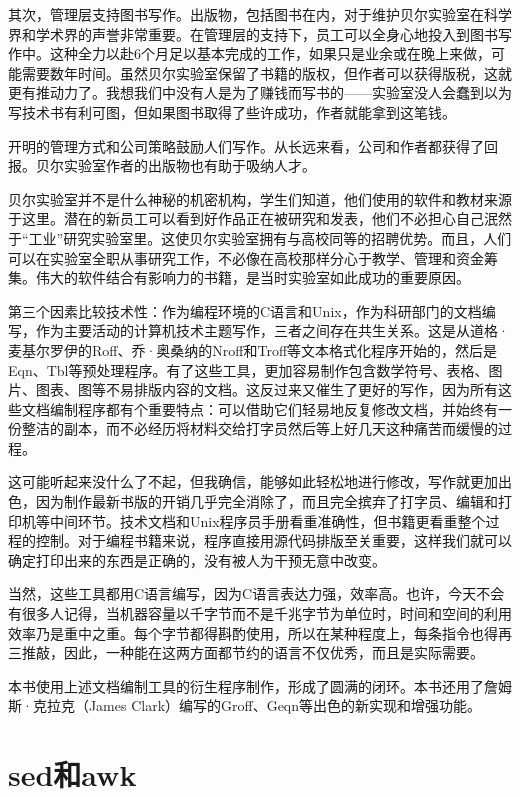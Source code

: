 \documentclass[a4paper,12pt,UTF8,twoside]{ctexbook}
\begin{document}
其次，管理层支持图书写作。出版物，包括图书在内，对于维护贝尔实验室在科学界和学术界的声誉非常重要。在管理层的支持下，员工可以全身心地投入到图书写作中。这种全力以赴6个月足以基本完成的工作，如果只是业余或在晚上来做，可能需要数年时间。虽然贝尔实验室保留了书籍的版权，但作者可以获得版税，这就更有推动力了。我想我们中没有人是为了赚钱而写书的——实验室没人会蠢到以为写技术书有利可图，但如果图书取得了些许成功，作者就能拿到这笔钱。

开明的管理方式和公司策略鼓励人们写作。从长远来看，公司和作者都获得了回报。贝尔实验室作者的出版物也有助于吸纳人才。

贝尔实验室并不是什么神秘的机密机构，学生们知道，他们使用的软件和教材来源于这里。潜在的新员工可以看到好作品正在被研究和发表，他们不必担心自己泯然于“工业”研究实验室里。这使贝尔实验室拥有与高校同等的招聘优势。而且，人们可以在实验室全职从事研究工作，不必像在高校那样分心于教学、管理和资金筹集。伟大的软件结合有影响力的书籍，是当时实验室如此成功的重要原因。

第三个因素比较技术性：作为编程环境的C语言和Unix，作为科研部门的文档编写，作为主要活动的计算机技术主题写作，三者之间存在共生关系。这是从道格·麦基尔罗伊的Roff、乔·奥桑纳的Nroff和Troff等文本格式化程序开始的，然后是Eqn、Tbl等预处理程序。有了这些工具，更加容易制作包含数学符号、表格、图片、图表、图等不易排版内容的文档。这反过来又催生了更好的写作，因为所有这些文档编制程序都有个重要特点：可以借助它们轻易地反复修改文档，并始终有一份整洁的副本，而不必经历将材料交给打字员然后等上好几天这种痛苦而缓慢的过程。

这可能听起来没什么了不起，但我确信，能够如此轻松地进行修改，写作就更加出色，因为制作最新书版的开销几乎完全消除了，而且完全摈弃了打字员、编辑和打印机等中间环节。技术文档和Unix程序员手册看重准确性，但书籍更看重整个过程的控制。对于编程书籍来说，程序直接用源代码排版至关重要，这样我们就可以确定打印出来的东西是正确的，没有被人为干预无意中改变。

当然，这些工具都用C语言编写，因为C语言表达力强，效率高。也许，今天不会有很多人记得，当机器容量以千字节而不是千兆字节为单位时，时间和空间的利用效率乃是重中之重。每个字节都得斟酌使用，所以在某种程度上，每条指令也得再三推敲，因此，一种能在这两方面都节约的语言不仅优秀，而且是实际需要。

本书使用上述文档编制工具的衍生程序制作，形成了圆满的闭环。本书还用了詹姆斯·克拉克（James Clark）编写的Groff、Geqn等出色的新实现和增强功能。





\section{sed和awk}
\end{document}
